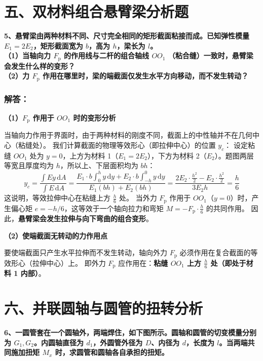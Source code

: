 \documentclass[11pt,a4paper]{ctexrep}
\newcommand{\diff}{\,\mathrm{d}}
\begin{document}
{%


\section*{五、双材料组合悬臂梁分析题}

\textbf{5、悬臂梁由两种材料不同、尺寸完全相同的矩形截面粘接而成。已知弹性模量 $E_1=2E_2$，矩形截面宽为 $b$，高为 $h$，梁长为 $l$。}\\
\textbf{（1）当轴向力 $F_{\text{p}}$ 的作用线与二杆的组合轴线 $OO_1$ （粘合缝）一致时，悬臂梁会发生什么样的变形？}\\
\textbf{（2）力 $F_{\text{p}}$ 作用在哪里时，梁的端截面仅发生水平方向移动，而不发生转动？}

\subsubsection*{解答：}

\textbf{（1）$F_{\text{p}}$ 作用于 $OO_1$ 时的变形分析}

当轴向力作用于界面时，由于两种材料的刚度不同，截面上的中性轴并不在几何中心（粘缝处）。
我们计算截面的物理等效形心（即拉伸中心）的位置 $y_c$：
设定粘缝 $OO_1$ 处为 $y=0$，上方为材料 1（$E_1=2E_2$），下方为材料 2（$E_2$）。题图两层等宽且厚度均为 $h$，所以上、下层面积均为 $bh$：
\[
    y_c = \frac{\int E y \diff A}{\int E \diff A} = \frac{E_1 \cdot b \int_{0}^h y \diff y + E_2 \cdot b \int_{-h}^0 y \diff y}{E_1 (bh) + E_2 (bh)} = \frac{2 E_2 \cdot \frac{h^2}{2} - E_2 \cdot \frac{h^2}{2}}{3 E_2 h} = \frac{h}{6}
\]
这说明，等效拉伸中心在粘缝上方 $\frac{h}{6}$ 处。
当外力 $F_{\text{p}}$ 作用于 $OO_1$（$y=0$）时，产生偏心矩 $e = -h/6$，这等效于一个轴向拉力和弯矩 $M = -F_{\text{p}} \cdot \frac{h}{6}$ 的共同作用。
因此，\textbf{悬臂梁会发生拉伸与向下弯曲的组合变形}。

\textbf{（2）使端截面无转动的力作用点}

要使端截面只产生水平拉伸而不发生转动，轴向外力 $F_{\text{p}}$ 必须作用在复合截面的等效形心（拉伸中心）上。
即外力 $F_{\text{p}}$ 应作用在：\textbf{粘缝 $OO_1$ 上方 $\frac{h}{6}$ 处（即处于材料 1 内部）}。




\section*{六、并联圆轴与圆管的扭转分析}

\textbf{6、一圆管套在一个圆轴外，两端焊住，如下图所示。圆轴和圆管的切变模量分别为 $G_1, G_2$。内圆轴直径为 $d_1$，外圆管外径为 $D$、内径为 $d$，长度为 $l$。当两端共同施加扭矩 $M_x$ 时，求圆管和圆轴各自承担的扭矩。}

}
\end{document}
